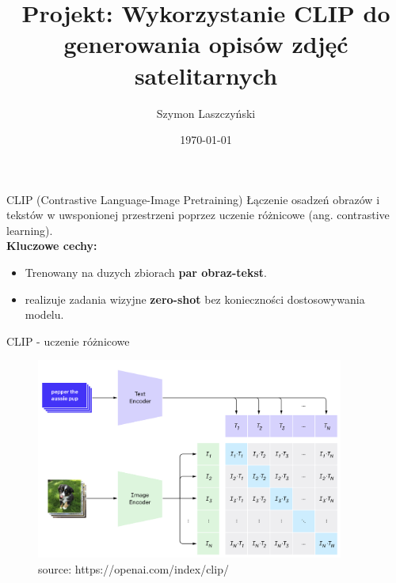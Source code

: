 \documentclass{beamer}
\title{Projekt: Wykorzystanie CLIP do generowania opisów zdjęć satelitarnych}
\author{Szymon Laszczyński}
\date{\today}
\begin{document}
\frame{\titlepage}

\begin{frame}{CLIP (Contrastive Language-Image Pretraining)}
  Łączenie osadzeń obrazów i tekstów w uwsponionej przestrzeni poprzez uczenie różnicowe (ang. contrastive learning). \\[1em]

  \textbf{Kluczowe cechy:}
  \begin{itemize}
    \item Trenowany na duzych zbiorach \textbf{par obraz-tekst}.
    \item realizuje zadania wizyjne \textbf{zero-shot} bez konieczności dostosowywania modelu.
  \end{itemize}
\end{frame}

\begin{frame}{CLIP - uczenie różnicowe}
  \begin{figure}
    \centering
    \includegraphics[width=0.9\textwidth]{../img/clip-overview-a.png}
    \caption*{\tiny source: https://openai.com/index/clip/}
  \end{figure}
\end{frame}


\end{document}
